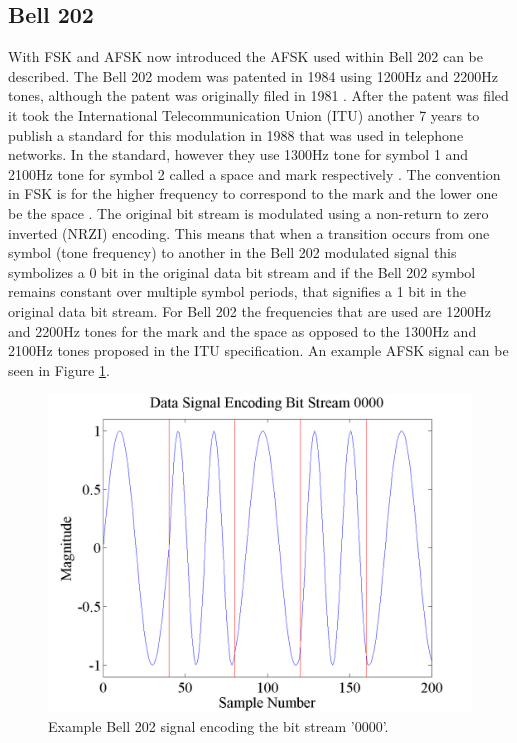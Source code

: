 \subsection{Bell 202}
With FSK and AFSK now introduced the AFSK used within Bell 202 can be described. The Bell 202 modem was patented in 1984 using 1200Hz and 2200Hz tones, although the patent was originally filed in 1981 \cite{stauffer1984fsk}. After the patent was filed it took the International Telecommunication Union (ITU) another 7 years to publish a standard for this modulation in 1988 that was used in telephone networks. In the standard, however they use 1300Hz tone for symbol 1 and 2100Hz tone for symbol 2 called a space and mark respectively \cite{ITUV23}. The convention in FSK is for the higher frequency to correspond to the mark and the lower one be the space \cite{Watson1980}. The original bit stream is modulated using a non-return to zero inverted (NRZI) encoding. This means that when a transition occurs from one symbol (tone frequency) to another in the Bell 202 modulated signal this symbolizes a 0 bit in the original data bit stream and if the Bell 202 symbol remains constant over multiple symbol periods, that signifies a 1 bit in the original data bit stream. For Bell 202 the frequencies that are used are 1200Hz and 2200Hz tones for the mark and the space as opposed to the 1300Hz and 2100Hz tones proposed in the ITU specification. An example AFSK signal can be seen in Figure \ref{exampleBitStream}.
\begin{figure}
  \centering
	\includegraphics[width=0.75\linewidth]{images/Datasignalencodingbitstream0000.png} 
	\caption{Example Bell 202 signal encoding the bit stream '0000'.}
	\label{exampleBitStream}
\end{figure}
